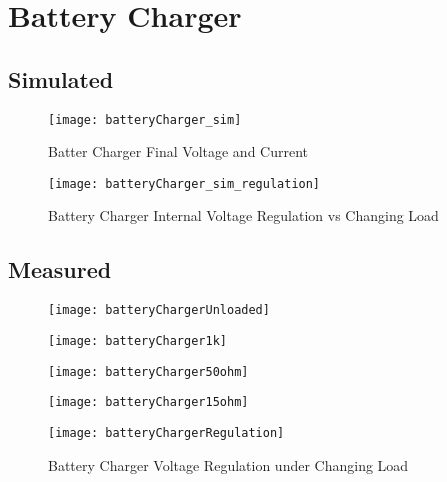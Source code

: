 \graphicspath{{content/3_results/figures}}
\section{Battery Charger}

\subsection{Simulated}

\begin{figure}[!htb]
  \centering
  \texttt{[image: batteryCharger\_sim]}
  \caption{Batter Charger Final Voltage and Current}
  \label{fig:batteryCharger_sim}
\end{figure}

\begin{figure}[!htb]
  \centering
  \texttt{[image: batteryCharger\_sim\_regulation]}
  \caption{Battery Charger Internal Voltage Regulation vs Changing Load}
  \label{fig:batteryCharger_sim_regulation}
\end{figure}

\pagebreak

\subsection{Measured}

\begin{figure}[!htb]
    \centering
    \begin{minipage}{.35\textwidth}
        \centering
        \texttt{[image: batteryChargerUnloaded]}
        \label{fig:batteryChargerUnloaded}
    \end{minipage}
    \begin{minipage}{.4\textwidth}
        \centering
        \texttt{[image: batteryCharger1k]}
        \label{fig:batteryCharger1k}
    \end{minipage}
\end{figure}

\begin{figure}[!htb]
    \centering
    \begin{minipage}{.35\textwidth}
        \centering
        \texttt{[image: batteryCharger50ohm]}
        \label{fig:batteryCharger50ohm}
    \end{minipage}    
    \begin{minipage}{.35\textwidth}
        \centering
        \texttt{[image: batteryCharger15ohm]}
        \label{fig:batteryCharger15ohm}
    \end{minipage}
\end{figure}

\begin{figure}[!htb]
  \centering
  \texttt{[image: batteryChargerRegulation]}
  \caption{Battery Charger Voltage Regulation under Changing Load}
  \label{fig:batteryChargerRegulation}
\end{figure}